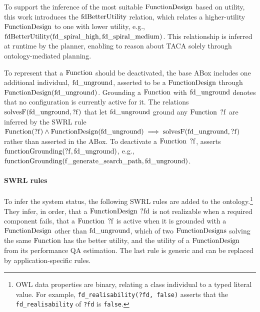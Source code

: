 To support the inference of the most suitable $\operatorname{FunctionDesign}$ based on utility, this work introduces the $\operatorname{fdBetterUtility}$ relation, which relates a higher-utility $\operatorname{FunctionDesign}$ to one with lower utility, e.g., $\operatorname{fdBetterUtility}(\operatorname{fd\_spiral\_high}, \operatorname{fd\_spiral\_medium})$. This relationship is inferred at runtime by the planner, enabling \planta to reason about TACA solely through ontology-mediated planning.

To represent that a $\operatorname{Function}$ should be deactivated, the base ABox includes one additional individual, $\operatorname{fd\_unground}$, asserted to be a $\operatorname{FunctionDesign}$ through $\operatorname{FunctionDesign}(\operatorname{fd\_unground})$. Grounding a $\operatorname{Function}$ with $\operatorname{fd\_unground}$ denotes that no configuration is currently active for it. The relations $\operatorname{solvesF}(\operatorname{fd\_unground}, \operatorname{?f})$ that let $\operatorname{fd\_unground}$ ground any $\operatorname{Function}$ $\operatorname{?f}$ are inferred by the SWRL rule $\operatorname{Function}(\operatorname{?f}) \wedge \operatorname{FunctionDesign}(\operatorname{fd\_unground}) \implies \operatorname{solvesF}(\operatorname{fd\_unground}, \operatorname{?f})$ rather than asserted in the ABox. To deactivate a $\operatorname{Function}$ $\operatorname{?f}$, \planta asserts $\operatorname{functionGrounding}(\operatorname{?f}, \operatorname{fd\_unground})$, e.g., $\operatorname{functionGrounding}(\operatorname{f\_generate\_search\_path}, \operatorname{fd\_unground})$.

\paragraph{SWRL rules}
To infer the system status, the following SWRL rules are added to the ontology.\footnote{\raggedright OWL data properties are binary, relating a class individual to a typed literal value. For example, \texttt{fd\_realisability(?fd, false)} asserts that the \texttt{fd\_realisability} of \texttt{?fd} is \texttt{false}.} %
They infer, in order, that a $\operatorname{FunctionDesign}$ $\operatorname{?fd}$ is not realizable when a required component fails, that a $\operatorname{Function}$ $\operatorname{?f}$ is active when it is grounded with a $\operatorname{FunctionDesign}$ other than $\operatorname{fd\_unground}$, which of two $\operatorname{FunctionDesigns}$ solving the same $\operatorname{Function}$ has the better utility, and the utility of a $\operatorname{FunctionDesign}$ from its performance QA estimation. The last rule is generic and can be replaced by application-specific rules.

